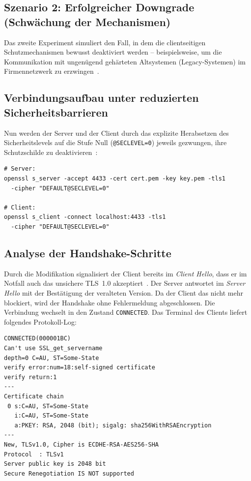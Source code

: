 \subsection{Szenario 2: Erfolgreicher Downgrade (Schwächung der Mechanismen)}
Das zweite Experiment simuliert den Fall, in dem die clientseitigen Schutzmechanismen bewusst deaktiviert werden -- beispielsweise, um die Kommunikation mit ungenügend gehärteten Altsystemen (Legacy-Systemen) im Firmennetzwerk zu erzwingen~\cite{sentinelone}.

\subsection*{Verbindungsaufbau unter reduzierten Sicherheitsbarrieren}
Nun werden der Server und der Client durch das explizite Herabsetzen des Sicherheitslevels auf die Stufe Null (\texttt{@SECLEVEL=0}) jeweils gezwungen, ihre Schutzschilde zu deaktivieren~\cite{openssl}:

\begin{lstlisting}[style=consolestyle]
# Server:
openssl s_server -accept 4433 -cert cert.pem -key key.pem -tls1
  -cipher "DEFAULT@SECLEVEL=0"

# Client:
openssl s_client -connect localhost:4433 -tls1
  -cipher "DEFAULT@SECLEVEL=0"
\end{lstlisting}

\subsection*{Analyse der Handshake-Schritte}
Durch die Modifikation signalisiert der Client bereits im \textit{Client Hello}, dass er im Notfall auch das unsichere TLS~1.0 akzeptiert~\cite{ssldragon}. Der Server antwortet im \textit{Server Hello} mit der Bestätigung der veralteten Version. Da der Client das nicht mehr blockiert, wird der Handshake ohne Fehlermeldung abgeschlossen. Die Verbindung wechselt in den Zustand \texttt{CONNECTED}. Das Terminal des Clients liefert folgendes Protokoll-Log:

\begin{lstlisting}
CONNECTED(000001BC)
Can't use SSL_get_servername
depth=0 C=AU, ST=Some-State
verify error:num=18:self-signed certificate
verify return:1
---
Certificate chain
 0 s:C=AU, ST=Some-State
   i:C=AU, ST=Some-State
   a:PKEY: RSA, 2048 (bit); sigalg: sha256WithRSAEncryption
---
New, TLSv1.0, Cipher is ECDHE-RSA-AES256-SHA
Protocol  : TLSv1
Server public key is 2048 bit
Secure Renegotiation IS NOT supported
\end{lstlisting}

